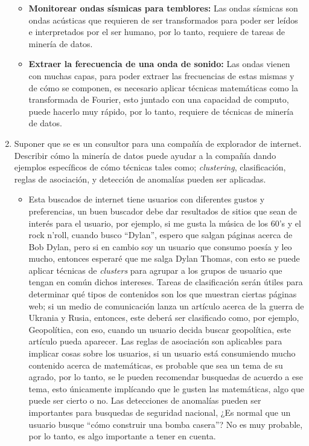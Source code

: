 \documentclass{article}
\begin{document}
\begin{enumerate}
\begin{itemize}
          \item \textbf{Monitorear ondas sísmicas para temblores:} Las ondas sísmicas son ondas acústicas que requieren de ser transformados para poder ser leídos e interpretados por el ser humano, por lo tanto, requiere de tareas de minería de datos.
          \item \textbf{Extraer la ferecuencia de una onda de sonido:} Las ondas vienen con muchas capas, para poder extraer las frecuencias de estas mismas y de cómo se componen, es necesario aplicar técnicas matemáticas como la transformada de Fourier, esto juntado con una capacidad de computo, puede hacerlo muy rápido, por lo tanto, requiere de técnicas de minería de datos.
        \end{itemize}
  \item Suponer que se es un consultor para una compañía de explorador de internet. Describir cómo la minería de datos puede ayudar a la compañía dando ejemplos específicos de cómo técnicas tales como; \textit{clustering}, clasificación, reglas de asociación, y detección de anomalías pueden ser aplicadas.
        \begin{itemize}
          \item Esta buscados de internet tiene usuarios con diferentes gustos y preferencias, un buen buscador debe dar resultados de sitios que sean de interés para el usuario, por ejemplo, si me gusta la música de los 60's y el rock n'roll, cuando busco ``Dylan'', espero que salgan páginas acerca de Bob Dylan, pero si en cambio soy un usuario que consumo poesía y leo mucho, entonces esperaré que me salga Dylan Thomas, con esto se puede aplicar técnicas de \textit{clusters} para agrupar a los grupos de usuario que tengan en común dichos intereses. Tareas de clasificación serán útiles para determinar qué tipos de contenidos son los que muestran ciertas páginas web; si un medio de comunicación lanza un artículo acerca de la guerra de Ukrania y Rusia, entonces, este deberá ser clasificado como, por ejemplo, Geopolítica, con eso, cuando un usuario decida buscar geopolítica, este artículo pueda aparecer. Las reglas de asociación son aplicables para implicar cosas sobre los usuarios, si un usuario está consumiendo mucho contenido acerca de matemáticas, es probable que sea un tema de su agrado, por lo tanto, se le pueden recomendar busquedas de acuerdo a ese tema, esto únicamente implícando que le gusten las matemáticas, algo que puede ser cierto o no. Las detecciones de anomalías pueden ser importantes para busquedas de seguridad nacional, ¿Es normal que un usuario busque ``cómo construir una bomba casera''? No es muy probable, por lo tanto, es algo importante a tener en cuenta.

\end{itemize}
\end{enumerate}
\end{document}
